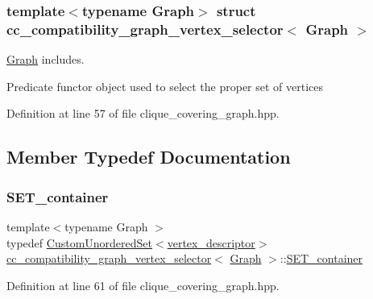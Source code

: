 \subsubsection*{template$<$typename Graph$>$\newline
struct cc\+\_\+compatibility\+\_\+graph\+\_\+vertex\+\_\+selector$<$ Graph $>$}

\hyperlink{structGraph}{Graph} includes. 

Predicate functor object used to select the proper set of vertices 

Definition at line 57 of file clique\+\_\+covering\+\_\+graph.\+hpp.



\subsection{Member Typedef Documentation}
\mbox{\label{structcc__compatibility__graph__vertex__selector_abe217f0679bd4c93a9492844634d4e82}} 
\subsubsection{\texorpdfstring{S\+E\+T\+\_\+container}{SET\_container}}
{\footnotesize\ttfamily template$<$typename Graph $>$ \\
typedef \hyperlink{classCustomUnorderedSet}{Custom\+Unordered\+Set}$<$\hyperlink{structcc__compatibility__graph__vertex__selector_a445b79c6570f741f69230996f98df72b}{vertex\+\_\+descriptor}$>$ \hyperlink{structcc__compatibility__graph__vertex__selector}{cc\+\_\+compatibility\+\_\+graph\+\_\+vertex\+\_\+selector}$<$ \hyperlink{structGraph}{Graph} $>$\+::\hyperlink{structcc__compatibility__graph__vertex__selector_abe217f0679bd4c93a9492844634d4e82}{S\+E\+T\+\_\+container}}



Definition at line 61 of file clique\+\_\+covering\+\_\+graph.\+hpp.

\mbox{\label{structcc__compatibility__graph__vertex__selector_a445b79c6570f741f69230996f98df72b}} 

